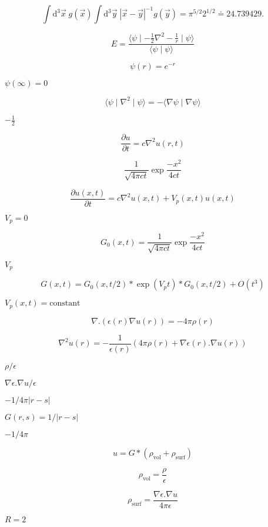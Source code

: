 \documentclass{article}
\begin{document}
\[
   \int \mathrm{d}^3 \vec{x} \; g(\vec{x}) \int \mathrm{d}^3 \vec{y} \; |\vec{x}-\vec{y}|^{-1} g(\vec{y}) = \pi^{5/2} 2^{1/2} \doteq 24.739429.
\]
\pagebreak

\[
    E = \frac{\langle \psi \mid - \frac{1}{2}  \nabla^2  - \frac{1}{r} \mid \psi \rangle}{\langle \psi \mid \psi \rangle}
\]
\pagebreak

\[
   \psi(r) = e^{-r}
\]
\pagebreak

$ \psi(\infty)=0 $
\pagebreak

\[
     \langle \psi \mid \nabla^2 \mid \psi \rangle = - \langle \nabla \psi \mid \nabla \psi \rangle
\]
\pagebreak

$-\frac{1}{2}$
\pagebreak

\[
\frac{\partial u}{\partial t} = c \nabla^2 u(r,t)
\]
\pagebreak

\[
\frac{1}{\sqrt{4 \pi c t}}  \exp \frac{-x^2}{4 c t}
\]
\pagebreak

\[
  \frac{\partial u(x,t)}{\partial t} = c \nabla^2 u(x,t) + V_p(x,t) u(x,t)
\]
\pagebreak

$ V_p = 0 $
\pagebreak

\[
  G_0(x,t) = \frac{1}{\sqrt{4 \pi c t}} \exp \frac{-x^2}{4 c t}
\]
\pagebreak

$ V_p $
\pagebreak

\[
  G(x,t) = G_0(x,t/2) * \exp(V_p t) * G_0(x,t/2) + O(t^3)
\]
\pagebreak

$ V_p(x,t)=\mbox{constant} $
\pagebreak

\[
\nabla . \left( \epsilon(r) \nabla u(r)  \right) = - 4 \pi \rho(r)
\]
\pagebreak

\[
   \nabla^2 u(r) = - \frac{1}{\epsilon(r)} \left( 4 \pi \rho(r) + \nabla \epsilon(r) .  \nabla u(r) \right)
\]
\pagebreak

$\rho / \epsilon$
\pagebreak

$\nabla \epsilon . \nabla u / \epsilon$
\pagebreak

$-1 / 4 \pi |r-s|$
\pagebreak

$G(r,s) = 1/|r-s|$
\pagebreak

$-1/4\pi$
\pagebreak

\[
   u = G * \left(\rho_{\mbox{vol}} + \rho_{\mbox{surf}} \right)
\]
\pagebreak

\[
   \rho_{\mbox{vol}} = \frac{\rho}{\epsilon}
\]
\pagebreak

\[
   \rho_{\mbox{surf}} = \frac{\nabla \epsilon .  \nabla u}{4 \pi \epsilon}
\]
\pagebreak

$R=2$
\pagebreak
\end{document}
